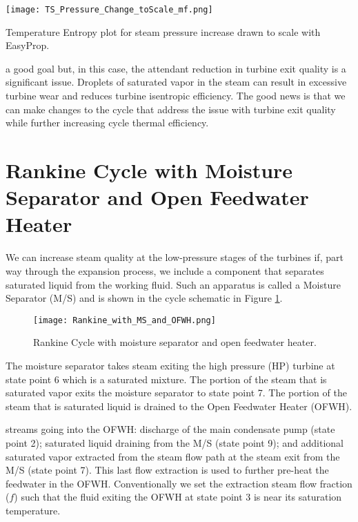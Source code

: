 \begin{marginfigure}
\texttt{[image: TS\_Pressure\_Change\_toScale\_mf.png]}
\caption{Temperature Entropy plot for steam pressure increase drawn to scale with EasyProp.}
\label{fig:T_S_increase_P_toScale}
\end{marginfigure} 

 a good goal but, in this case, the attendant reduction in turbine exit quality is a significant issue.  Droplets of saturated vapor in the steam can result in excessive turbine wear and reduces turbine isentropic efficiency.  The good news is that we can make changes to the cycle that address the issue with turbine exit quality while further increasing cycle thermal efficiency.

\section{Rankine Cycle with Moisture Separator and Open Feedwater Heater}
We can increase steam quality at the low-pressure stages of the turbines if, part way through the expansion process, we include a component that separates saturated liquid from the working fluid.  Such an apparatus is called a Moisture Separator (M/S) and is shown in the cycle schematic in Figure \ref{fig:RS_MS_OFWH}.

\begin{figure}
\texttt{[image: Rankine\_with\_MS\_and\_OFWH.png]}
\caption{Rankine Cycle with moisture separator and open feedwater heater.}
\label{fig:RS_MS_OFWH}
\end{figure} 

The moisture separator takes steam exiting the high pressure (HP) turbine at state point 6 which is a saturated mixture.  The portion of the steam that is saturated vapor exits the moisture separator to state point 7.  The portion of the steam that is saturated liquid is drained to the Open Feedwater Heater (OFWH).

 streams going into the OFWH: discharge of the main condensate pump (state point 2); saturated liquid draining from the M/S (state point 9); and additional saturated vapor extracted from the steam flow path at the steam exit from the M/S (state point 7).  This last flow extraction is used to further pre-heat the feedwater in the OFWH.  Conventionally we set the extraction steam flow fraction ($f$) such that the fluid exiting the OFWH at state point 3 is near its saturation temperature.

